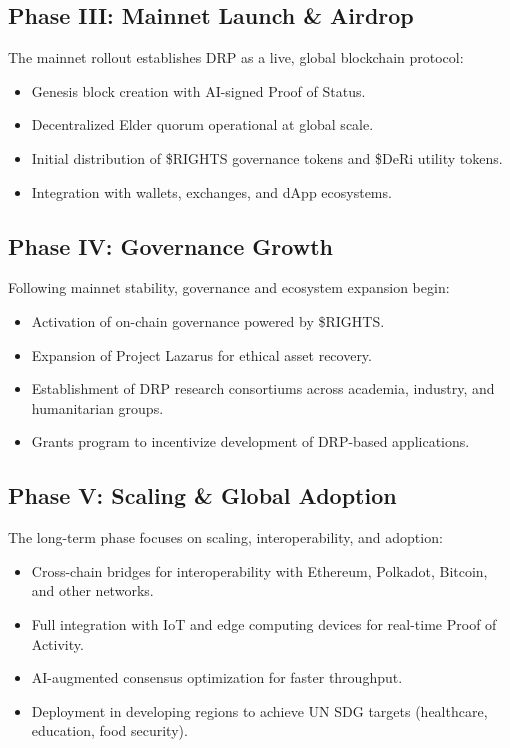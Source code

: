 \documentclass[11pt,a4paper]{article}
\begin{document}
\subsection{Phase III: Mainnet Launch \& Airdrop}
The mainnet rollout establishes DRP as a live, global blockchain protocol:
\begin{itemize}
    \item Genesis block creation with AI-signed Proof of Status.
    \item Decentralized Elder quorum operational at global scale.
    \item Initial distribution of \$RIGHTS governance tokens and \$DeRi utility tokens.
    \item Integration with wallets, exchanges, and dApp ecosystems.
\end{itemize}

\subsection{Phase IV: Governance Growth}
Following mainnet stability, governance and ecosystem expansion begin:
\begin{itemize}
    \item Activation of on-chain governance powered by \$RIGHTS.
    \item Expansion of Project Lazarus for ethical asset recovery.
    \item Establishment of DRP research consortiums across academia, industry, and humanitarian groups.
    \item Grants program to incentivize development of DRP-based applications.
\end{itemize}

\subsection{Phase V: Scaling \& Global Adoption}
The long-term phase focuses on scaling, interoperability, and adoption:
\begin{itemize}
    \item Cross-chain bridges for interoperability with Ethereum, Polkadot, Bitcoin, and other networks.
    \item Full integration with IoT and edge computing devices for real-time Proof of Activity.
    \item AI-augmented consensus optimization for faster throughput.
    \item Deployment in developing regions to achieve UN SDG targets (healthcare, education, food security).
\end{itemize}
\end{document}
